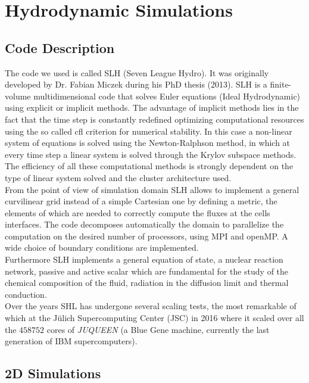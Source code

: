 
\chapter{Hydrodynamic Simulations}
\section{Code Description}

The code we used is called SLH (Seven League Hydro). It was originally developed by Dr. Fabian Miczek during his PhD thesis (2013). SLH is a finite-volume multidimensional code that solves Euler equations (Ideal Hydrodynamic) using explicit or implicit methods. The advantage of implicit methods lies in the fact that the time step is constantly redefined optimizing computational resources using the so called cfl criterion for numerical stability. In this case a non-linear system of equations is solved using the Newton-Ralphson method, in which at every time step a linear system is solved through the Krylov subspace methods. The efficiency of all these computational methods is strongly dependent on the type of linear system solved and the cluster architecture used. \\
From the point of view of simulation domain SLH allows to implement a general curvilinear grid instead of a simple Cartesian one by defining a metric, the elements of which are needed to correctly compute the fluxes at the cells interfaces. The code decomposes automatically the domain to parallelize the computation on the desired number of processors, using MPI and openMP. A wide choice of boundary conditions are implemented. \\
Furthermore SLH implements a general equation of state, a nuclear reaction network, passive and active scalar which are fundamental for the study of the chemical composition of the fluid, radiation in the diffusion limit and thermal conduction. \\
Over the years SHL has undergone several scaling tests, the most remarkable of which at the Jülich Supercomputing Center (JSC) in 2016 where it scaled over all the $458752$ cores of \textit{JUQUEEN} (a Blue Gene machine, currently the last generation of IBM supercomputers).
\section{2D Simulations}
